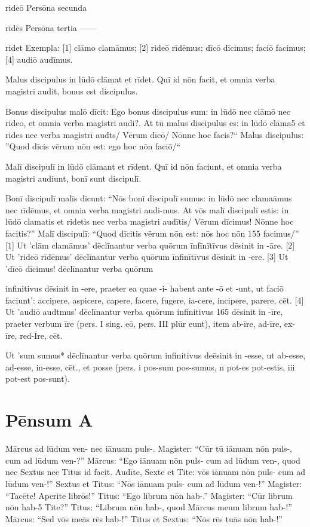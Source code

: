 \documentclass[11pt,openany]{book}
\newcommand{\booksection}[1]{%
  \phantomsection\section*{#1}%
  \addcontentsline{toc}{section}{#1}\markright{#1}}
\begin{document}
rideō Persōna secunda

ridēs Persōna tertia ------

ridet Exempla: [1] clāmo clamāmus; [2] rideō rīdēmus; dīcō dīcimus; faciō facimus; [4] audiō audīmus.

Malus discipulus in lūdō clāmat et rīdet. Quī id nōn facit, et omnia verba magistri audit, bonus est discipulus.

Bonus discipulus malō dīcit: Ego bonus discipulus sum: in lūdō nec clāmō nec rideo, et omnia verba magistri audi?. At tū malus discipulus es: in lūdō clāma5 et rides nec verba magistrī audts/ Vērum dīcō/ Nōnne hoc facis?`` Malus discipulus: ''Quod dīcis vērum nōn est: ego hoc nōn faciō/``

Malī discipulī in lūdō clāmant et rīdent. Quī id nōn faciunt, et omnia verba magistri audiunt, bonī sunt discipulī.

Bonī discipulī malīs dīcunt: ``Nōs bonī discipulī sumus: in lūdō nec clamaāmus nec rīdēmus, et omnia verba magistri audi-mus. At vōs malī discipulī estis: in lūdō clamatis et ridetis nec verba magistri audītis/ Vērum dīcimus! Nōnne hoc facitis?'' Malī discipulī: ``Quod dīcitis vērum nōn est: nōs hoc nōn 155 facimus/'' [1] Ut 'clām clamāmus' dēclīnantur verba quōrum īnfīnītīvus dēsinit in -āre. [2] Ut 'rideō rīdēmus' dēclīnantur verba quōrum īnfinītīvus dēsinit in -ere. [3] Ut 'dīcō dīcimus! dēclīnantur verba quōrum

infinitivus dēsinit in -ere, praeter ea quae -i- habent ante -ō et -unt, ut faciō faciunt': accipere, aspicere, capere, facere, fugere, ia-cere, incipere, parere, cēt. [4] Ut 'audiō audtmus' dēclīnantur verba quōrum infinitivus 165 dēsinit in -īre, praeter verbum īre (pers. I sing. eō, pers. III plūr eunt), item ab-īre, ad-īre, ex-īre, red-Īre, cēt.

Ut 'sum sumus* dēclīnantur verba quōrum infinitivus deēsinit in -esse, ut ab-esse, ad-esse, in-esse, cēt., et posse (pers. i pos-sum pos-sumus, n pot-es pot-estis, iii pot-est pos-sunt).

\booksection{Pēnsum A}

Mārcus ad lūdum ven- nec iānuam puls-. Magister: ``Cūr tū iānuam nōn puls-, cum ad lūdum ven-?'' Mārcus: ``Ego iānuam nōn puls- cum ad lūdum ven-, quod nec Sextus nec Titus id facit. Audīte, Sexte et Tite: vōs iānuam nōn puls- cum ad lūdum ven-!'' Sextus et Titus: ``Nōs iānuam puls- cum ad lūdum ven-!'' Magister: ``Tacēte! Aperite librōs!'' Titus: ``Ego librum nōn hab-.'' Magister: ``Cūr librum nōn hab-5 Tite?'' Titus: ``Librum nōn hab-, quod Mārcus meum librum hab-!'' Mārcus: ``Sed vōs meās rēs hab-!'' Titus et Sextus: ``Nōs rēs tuās nōn hab-!''
\end{document}
